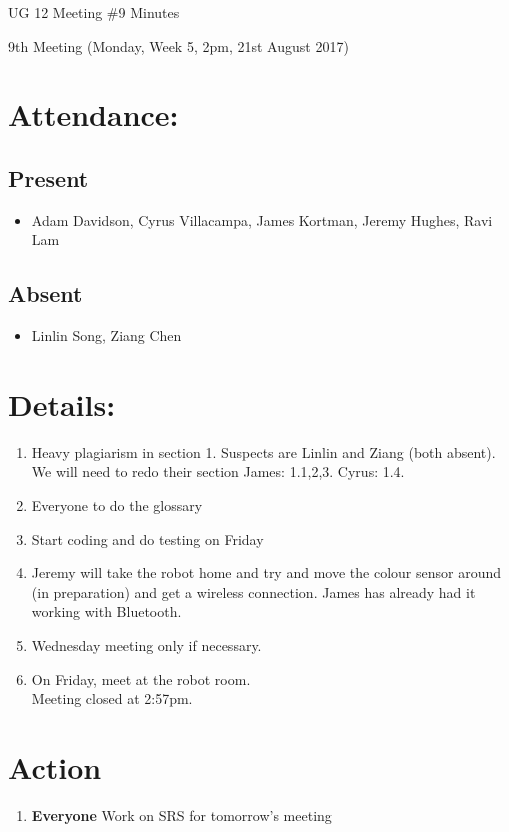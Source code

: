 \documentclass{article}
\begin{document}
\begin{adjustwidth}{2.5em}{0pt}
\begin{center}
\Large{UG 12 Meeting \#9 Minutes}\\
\end{center}
\end{adjustwidth}


9th Meeting (Monday, Week 5, 2pm, 21st August 2017)
\section{Attendance:}
\subsection*{Present}
\begin{itemize}
\item Adam Davidson, Cyrus Villacampa, James Kortman, Jeremy Hughes, Ravi Lam
\end{itemize}
\subsection*{Absent}
\begin{itemize}
\item Linlin Song, Ziang Chen
\end {itemize}

\section{Details:}
\begin{enumerate}
\item Heavy plagiarism in section 1. Suspects are Linlin and Ziang (both absent). We will need to redo their section James: 1.1,2,3. Cyrus: 1.4.
\item Everyone to do the glossary
\item Start coding and do testing on Friday
\item Jeremy will take the robot home and try and move the colour sensor around (in preparation) and get a wireless connection. James has already had it working with Bluetooth.
\item Wednesday meeting only if necessary.
\item On Friday, meet at the robot room.\\
Meeting closed at 2:57pm.
\end{enumerate}

\section{Action}
\begin{enumerate}
\item \textbf{Everyone} Work on SRS for tomorrow's meeting
\end{enumerate}
\end{document}

